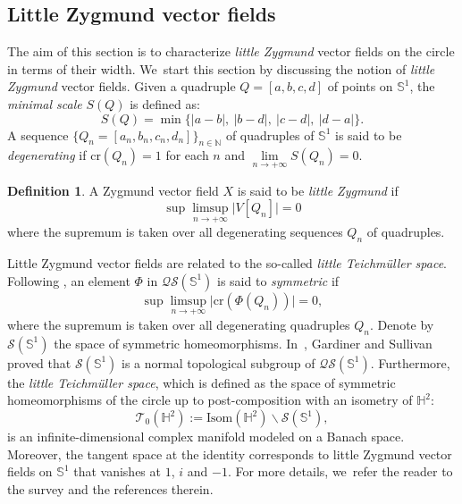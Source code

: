 \documentclass[10pt]{amsart}
\theoremstyle{plain}
\theoremstyle{definition}
\newtheorem{defi}[cor]{Definition}
\begin{document}
\subsection{Little Zygmund vector fields}
The aim of this section is to characterize \emph{little Zygmund} vector fields on the circle in terms of their width. We~start this section by discussing the notion of \emph{little Zygmund} vector fields. Given a quadruple $Q=[a,b,c,d]$ of points on $\mathbb{S}^1$, the \emph{minimal scale} $S(Q)$ is defined as:
\[
S(Q)=\min\{\lvert a-b\rvert, \ \lvert b-d\rvert,\ \lvert c-d\rvert, \ \lvert d-a\rvert \}.
\]
A sequence $ \{Q_n = [a_n, b_n, c_n, d_n]\}_{n\in\mathbb{N}}$ of quadruples of $\mathbb{S}^1$ is said to be \emph{degenerating} if $\mathrm{cr}(Q_n)=1$ for each $n$ and $\lim\limits_{n \rightarrow +\infty} S(Q_n)=0$.
\begin{defi}
A Zygmund vector field $X$ is said to be \emph{little Zygmund} if
\[
\sup\limsup\limits_{n \rightarrow +\infty} \lvert V[Q_n]\rvert=0
\]
where the supremum is taken over all degenerating sequences $Q_n$ of quadruples.
\end{defi}
Little Zygmund vector fields are related to the so-called \emph{little Teichmüller space}. Following \cite{Fan_Hu_Little}, an element $\Phi$ in $\mathcal{QS}(\mathbb{S}^1)$ is said to \emph{symmetric} if
\[
\sup\limsup\limits_{n \rightarrow +\infty} \lvert \mathrm{cr}(\Phi(Q_n))\rvert=0,
\]
where the supremum is taken over all degenerating quadruples $Q_n$. Denote by $\mathcal{S}(\mathbb{S}^1)$ the space of symmetric homeomorphisms. In~\cite{Gardiner_Sullivan}, Gardiner and Sullivan proved that $\mathcal{S}(\mathbb{S}^1)$ is a normal topological subgroup of $\mathcal{QS}(\mathbb{S}^1)$. Furthermore, the \emph{little Teichmüller space}, which is defined as the space of symmetric homeomorphisms of the circle up to post-composition with an isometry of $\mathbb{H}^2$:
\[
\mathcal{T}_0(\mathbb{H}^2):=\mathrm{Isom}(\mathbb{H}^2)\backslash \mathcal{S}(\mathbb{S}^1),
\]
is an infinite-dimensional complex manifold modeled on a Banach space. Moreover, the tangent space at the identity corresponds to little Zygmund vector fields on $\mathbb{S}^1$ that vanishes at $1$, $i$ and $-1$. For more details, we~refer the reader to the survey \cite{HU_Survey} and the references therein.
\end{document}
